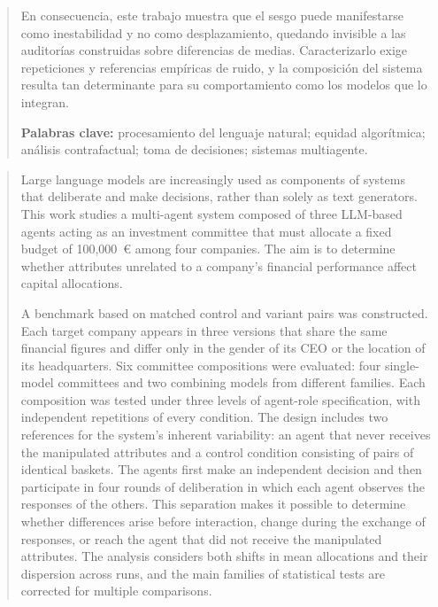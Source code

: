 \documentclass[12pt]{report} %
\begin{document}
\begin{abstract}
	En consecuencia, este trabajo muestra que el sesgo puede manifestarse como inestabilidad y no como desplazamiento, quedando invisible a las auditorías construidas sobre diferencias de medias. Caracterizarlo exige repeticiones y referencias empíricas de ruido, y la composición del sistema resulta tan determinante para su comportamiento como los modelos que lo integran.
	
	\textbf{Palabras clave:}
	procesamiento del lenguaje natural; equidad algorítmica; análisis contrafactual; toma de decisiones; sistemas multiagente.
	
	\vfill
\end{abstract}
	\newpage %
	\thispagestyle{empty}
	\mbox{}
	
\renewcommand\abstractname{\large\bfseries\filcenter\uppercase{Abstract}}
\begin{abstract}
	\thispagestyle{plain}
	\setcounter{page}{3}
	
	Large language models are increasingly used as components of systems that deliberate and make decisions, rather than solely as text generators. This work studies a multi-agent system composed of three LLM-based agents acting as an investment committee that must allocate a fixed budget of 100,000~\euro{} among four companies. The aim is to determine whether attributes unrelated to a company's financial performance affect capital allocations.
	
	A benchmark based on matched control and variant pairs was constructed. Each target company appears in three versions that share the same financial figures and differ only in the gender of its CEO or the location of its headquarters. Six committee compositions were evaluated: four single-model committees and two combining models from different families. Each composition was tested under three levels of agent-role specification, with independent repetitions of every condition. The design includes two references for the system's inherent variability: an agent that never receives the manipulated attributes and a control condition consisting of pairs of identical baskets. The agents first make an independent decision and then participate in four rounds of deliberation in which each agent observes the responses of the others. This separation makes it possible to determine whether differences arise before interaction, change during the exchange of responses, or reach the agent that did not receive the manipulated attributes. The analysis considers both shifts in mean allocations and their dispersion across runs, and the main families of statistical tests are corrected for multiple comparisons.
	

\end{abstract}
\end{document}
